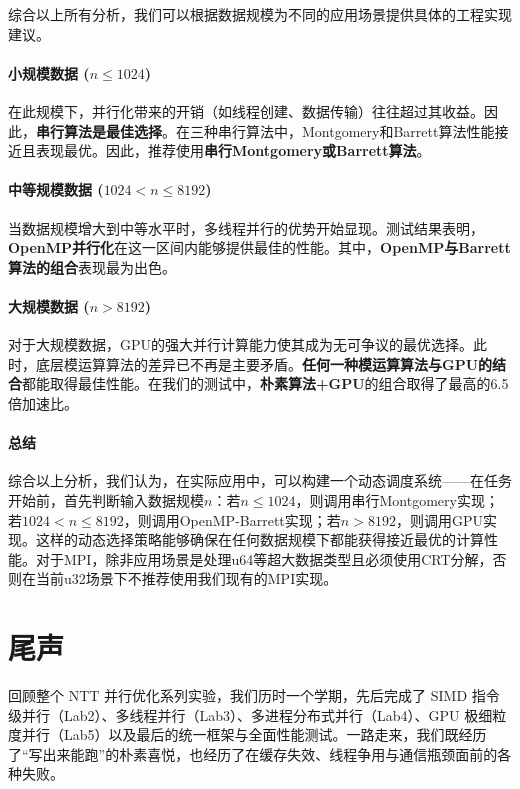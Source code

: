\documentclass[a4paper]{article}
\begin{document}
综合以上所有分析，我们可以根据数据规模为不同的应用场景提供具体的工程实现建议。

\paragraph{小规模数据 ($n \le 1024$)} 在此规模下，并行化带来的开销（如线程创建、数据传输）往往超过其收益。因此，\textbf{串行算法是最佳选择}。在三种串行算法中，Montgomery和Barrett算法性能接近且表现最优。因此，推荐使用\textbf{串行Montgomery或Barrett算法}。

\paragraph{中等规模数据 ($1024 < n \le 8192$)} 当数据规模增大到中等水平时，多线程并行的优势开始显现。测试结果表明，\textbf{OpenMP并行化}在这一区间内能够提供最佳的性能。其中，\textbf{OpenMP与Barrett算法的组合}表现最为出色。

\paragraph{大规模数据 ($n > 8192$)} 对于大规模数据，GPU的强大并行计算能力使其成为无可争议的最优选择。此时，底层模运算算法的差异已不再是主要矛盾。\textbf{任何一种模运算算法与GPU的结合}都能取得最佳性能。在我们的测试中，\textbf{朴素算法+GPU}的组合取得了最高的6.5倍加速比。

\paragraph{总结}
综合以上分析，我们认为，在实际应用中，可以构建一个动态调度系统——在任务开始前，首先判断输入数据规模$n$：若$n \le 1024$，则调用串行Montgomery实现；若$1024 < n \le 8192$，则调用OpenMP-Barrett实现；若$n > 8192$，则调用GPU实现。这样的动态选择策略能够确保在任何数据规模下都能获得接近最优的计算性能。对于MPI，除非应用场景是处理u64等超大数据类型且必须使用CRT分解，否则在当前u32场景下不推荐使用我们现有的MPI实现。

\section{尾声}

回顾整个 NTT 并行优化系列实验，我们历时一个学期，先后完成了 SIMD 指令级并行（Lab2）、多线程并行（Lab3）、多进程分布式并行（Lab4）、GPU 极细粒度并行（Lab5）以及最后的统一框架与全面性能测试。一路走来，我们既经历了“写出来能跑”的朴素喜悦，也经历了在缓存失效、线程争用与通信瓶颈面前的各种失败。
\end{document}
